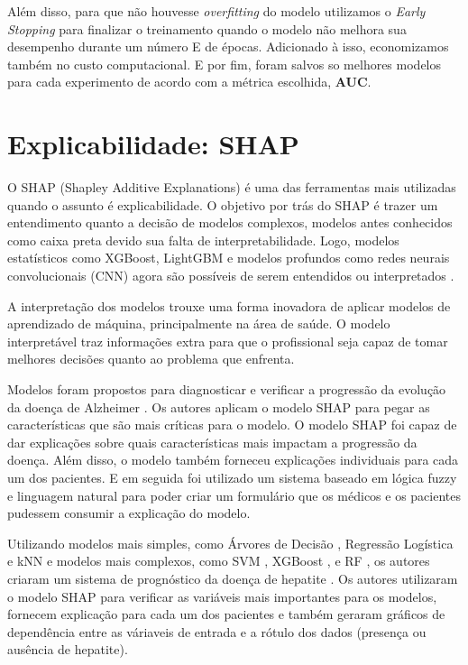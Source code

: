\documentclass[ %
	msc, %
	portugues %
]{../ppgccufmg}
\begin{document}
    Além disso, para que não houvesse \textit{overfitting} \citep{GoodBengCour16} do modelo utilizamos o
    \textit{Early Stopping} para finalizar o treinamento quando o modelo não melhora sua desempenho
    durante um número E de épocas. Adicionado à isso, economizamos também no custo computacional. E
    por fim, foram salvos so melhores modelos para cada experimento de acordo com a métrica
    escolhida, \textbf{AUC}.

    \section{Explicabilidade: SHAP}
    \label{sec:shap}

    O SHAP (Shapley Additive Explanations) é uma das ferramentas mais utilizadas quando o assunto é
    explicabilidade. O objetivo por trás do SHAP é trazer um entendimento quanto a decisão de
    modelos complexos, modelos antes conhecidos como caixa preta devido sua falta de
    interpretabilidade. Logo, modelos estatísticos como XGBoost, LightGBM e modelos profundos como
    redes neurais convolucionais (CNN) agora são possíveis de serem entendidos ou interpretados
    \citep{NIPS2017_7062}.

    A interpretação dos modelos trouxe uma forma inovadora de aplicar modelos de aprendizado de
    máquina, principalmente na área de saúde. O modelo interpretável traz informações extra para que
    o profissional seja capaz de tomar melhores decisões quanto ao problema que enfrenta.

    Modelos foram propostos para diagnosticar e verificar a progressão da
    evolução da doença de Alzheimer \citep{El-Sappagh2021}. Os autores aplicam o modelo SHAP para pegar as características
    que são mais críticas para o modelo. O modelo SHAP foi capaz de dar explicações sobre quais
    características mais impactam a progressão da doença. Além disso, o modelo também forneceu
    explicações individuais para cada um dos pacientes. E em seguida foi utilizado um sistema
    baseado em lógica fuzzy \citep{fuzzy} e linguagem natural para poder criar um formulário que os médicos e os
    pacientes pudessem consumir a explicação do modelo.

    Utilizando modelos mais simples, como Árvores de Decisão \citep{quinlan:induction},
    Regressão Logística \citep{cox1958regression} e kNN \citep{kNN} e
    modelos mais complexos, como SVM \citep{svm}, XGBoost \citep{DBLP:journals/corr/ChenG16}, e
    RF \citep{breiman2001random}, os autores criaram
    um sistema de prognóstico da doença de hepatite \citep{PengJunfeng2021AEAI}. Os autores
    utilizaram o modelo SHAP para verificar as variáveis
    mais importantes para os modelos, fornecem explicação para cada um dos pacientes e também
    geraram gráficos de dependência entre as váriaveis de entrada e a rótulo dos dados (presença ou
    ausência de hepatite).
\end{document}
